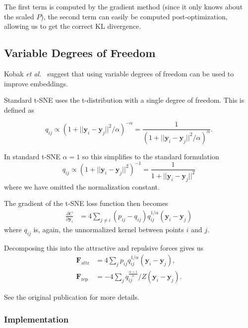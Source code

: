 \documentclass[11pt]{article}
\begin{document}
The first term is computed by the gradient method (since it only knows about the scaled $P$), the second term can easily be computed post-optimization, allowing us to get the correct KL divergence.

\subsection{Variable Degrees of Freedom}

Kobak \textit{et al.}~\cite{kobak2019heavy} suggest that using variable degrees of freedom can be used to improve embeddings.

Standard t-SNE uses the t-distribution with a single degree of freedom. This is defined as 

\begin{equation}
q_{ij} \propto \left ( 1 + || \mathbf{y}_i - \mathbf{y}_j ||^2 / \alpha \right )^{-\alpha} = \frac{1}{\left( 1 + || \mathbf{y}_i - \mathbf{y}_j ||^2 / \alpha \right)^\alpha }.
\end{equation}

In standard t-SNE $\alpha=1$ so this simplifies to the standard formulation
\begin{equation}
q_{ij} \propto \left ( 1 + || \mathbf{y}_i - \mathbf{y}_j ||^2 \right )^{-1} = \frac{1}{1 + || \mathbf{y}_i - \mathbf{y}_j ||^2 }
\end{equation}
where we have omitted the normalization constant.

The gradient of the t-SNE loss function then becomes
\begin{align}
\frac{\partial C}{\partial \mathbf{y}_i} &= 4 \sum_{j \neq i} \left ( p_{ij} - q_{ij} \right ) q_{ij}^{1/\alpha} \left ( \mathbf{y}_i - \mathbf{y}_j \right )
\end{align}
where $q_{ij}$ is, again, the unnormalized kernel between points $i$ and $j$.

Decomposing this into the attractive and repulsive forces gives us
\begin{align}
\mathbf{F}_{\text{attr}} &= 4 \sum_j p_{ij} q_{ij}^{1/\alpha} (\mathbf{y}_i - \mathbf{y}_j), \\
\mathbf{F}_{\text{rep}} &= - 4 \sum_j q_{ij}^{\frac{\alpha+1}{\alpha}} / Z (\mathbf{y}_i - \mathbf{y}_j).
\end{align}

See the original publication for more details.

\subsubsection{Implementation}
\end{document}
